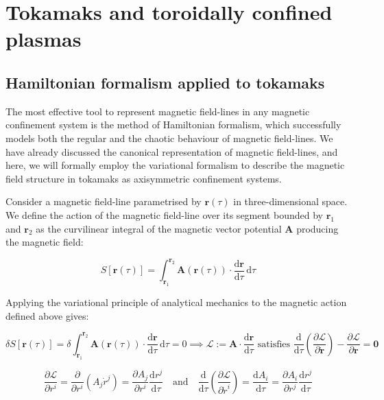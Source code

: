 \chapter{Tokamaks and toroidally confined plasmas}

\section{Hamiltonian formalism applied to tokamaks}

The most effective tool to represent magnetic field-lines in any magnetic confinement system is the method of Hamiltonian formalism, which successfully models both the regular and the chaotic behaviour of magnetic field-lines. We have already discussed the canonical representation of magnetic field-lines, and here, we will formally employ the variational formalism to describe the magnetic field structure in tokamaks as axisymmetric confinement systems.

\quad Consider a magnetic field-line parametrised by $\mathbf{r}(\tau)$ in three-dimensional space. We define the action of the magnetic field-line over its segment bounded by $\mathbf{r}_1$ and $\mathbf{r}_2$ as the curvilinear integral of the magnetic vector potential $\mathbf{A}$ producing the magnetic field:

\begin{equation}
    \label{eq-5-185}
    S[\mathbf{r}(\tau)]=\int_{\mathbf{r}_1}^{\mathbf{r}_2}\mathbf{A}(\mathbf{r}(\tau))\cdot\frac{\mathrm{d}\mathbf{r}}{\mathrm{d}\tau}\,\text{d}\tau
\end{equation}

Applying the variational principle of analytical mechanics to the magnetic action defined above gives:

\begin{equation}
    \delta S[\mathbf{r}(\tau)]=\delta\int_{\mathbf{r}_1}^{\mathbf{r}_2}\mathbf{A}(\mathbf{r}(\tau))\cdot\frac{\mathrm{d}\mathbf{r}}{\mathrm{d}\tau}\,\mathrm{d}\tau=0\implies\mathcal{L}:=\mathbf{A}\cdot\frac{\mathrm{d}\mathbf{r}}{\mathrm{d}\tau}\text{ satisfies }\frac{\mathrm{d}}{\mathrm{d}\tau}\left(\frac{\partial\mathcal{L}}{\partial\dot{\mathbf{r}}}\right)-\frac{\partial\mathcal{L}}{\partial\mathbf{r}}=\mathbf{0}
\end{equation}

\begin{equation}
    \frac{\partial\mathcal{L}}{\partial r^i}=\frac{\partial}{\partial r^i}(A_j\dot{r}^j)=\frac{\partial A_j}{\partial r^i}\frac{\mathrm{d}r^j}{\mathrm{d}\tau}\quad\text{and}\quad\frac{\mathrm{d}}{\mathrm{d}\tau}\left(\frac{\partial\mathcal{L}}{\partial\dot{r}^i}\right)=\frac{\mathrm{d}A_i}{\mathrm{d}\tau}=\frac{\partial A_i}{\partial r^j}\frac{\mathrm{d}r^j}{\mathrm{d}\tau}
\end{equation}

